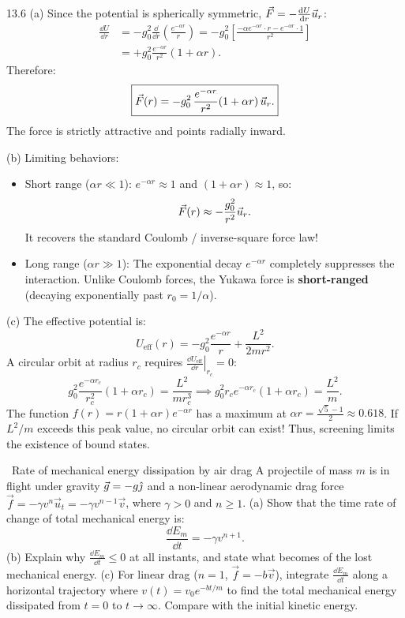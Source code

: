 \begin{tabletworkspace}[6.5cm]
\end{tabletworkspace}

\begin{solution}{13.6}
(a) Since the potential is spherically symmetric, $\vec{F} = -\frac{\mathrm{d} U}{\mathrm{d} r}\vec{u}_r$:
\begin{align*}
\frac{\dd U}{\dd r} &= -g_0^2 \frac{\dd}{\dd r}\left(\frac{e^{-\alpha r}}{r}\right) = -g_0^2\left[ \frac{-\alpha e^{-\alpha r}\cdot r - e^{-\alpha r}\cdot 1}{r^2} \right] \\
&= +g_0^2 \frac{e^{-\alpha r}}{r^2}(1 + \alpha r).
\end{align*}
Therefore:
\[
\boxed{\vec{F}(r) = -g_0^2\,\frac{e^{-\alpha r}}{r^2}(1 + \alpha r)\,\vec{u}_r.}
\]
The force is strictly attractive and points radially inward.

(b) Limiting behaviors:
\begin{itemize}[leftmargin=1.4em,itemsep=2pt]
  \item Short range ($\alpha r \ll 1$): $e^{-\alpha r} \approx 1$ and $(1+\alpha r) \approx 1$, so:
  \[
  \vec{F}(r) \approx -\frac{g_0^2}{r^2}\vec{u}_r.
  \]
  It recovers the standard Coulomb / inverse-square force law!
  \item Long range ($\alpha r \gg 1$): The exponential decay $e^{-\alpha r}$ completely suppresses the interaction. Unlike Coulomb forces, the Yukawa force is \textbf{short-ranged} (decaying exponentially past $r_0 = 1/\alpha$).
\end{itemize}

(c) The effective potential is:
\[
U_{\text{eff}}(r) = -g_0^2\frac{e^{-\alpha r}}{r} + \frac{L^2}{2mr^2}.
\]
A circular orbit at radius $r_c$ requires $\left.\frac{\dd U_{\text{eff}}}{\dd r}\right|_{r_c} = 0$:
\[
g_0^2\frac{e^{-\alpha r_c}}{r_c^2}(1 + \alpha r_c) = \frac{L^2}{m r_c^3} \implies g_0^2 r_c e^{-\alpha r_c}(1 + \alpha r_c) = \frac{L^2}{m}.
\]
The function $f(r) = r(1+\alpha r)e^{-\alpha r}$ has a maximum at $\alpha r = \frac{\sqrt{5}-1}{2} \approx 0.618$.
If $L^2/m$ exceeds this peak value, no circular orbit can exist! Thus, screening limits the existence of bound states.
\end{solution}

\begin{exercise}{\mastery\ Rate of mechanical energy dissipation by air drag}
A projectile of mass $m$ is in flight under gravity $\vec{g} = -g\hat{\jmath}$ and a non-linear aerodynamic drag force $\vec{f} = -\gamma v^n\vec{u}_t = -\gamma v^{n-1}\vec{v}$, where $\gamma > 0$ and $n \ge 1$.
(a) Show that the time rate of change of total mechanical energy is:
\[
\frac{\dd E_m}{\dd t} = -\gamma v^{n+1}.
\]
(b) Explain why $\frac{\dd E_m}{\dd t} \le 0$ at all instants, and state what becomes of the lost mechanical energy.
(c) For linear drag ($n = 1$, $\vec{f} = -b\vec{v}$), integrate $\frac{\dd E_m}{\dd t}$ along a horizontal trajectory where $v(t) = v_0 e^{-bt/m}$ to find the total mechanical energy dissipated from $t=0$ to $t\to\infty$. Compare with the initial kinetic energy.
\end{exercise}

